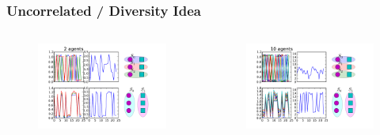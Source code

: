\documentclass[xcolor=dvipsnames]{beamer}
\begin{document}
%
%
\begin{frame}
	\frametitle{Uncorrelated / Diversity Idea}

	\begin{columns}
		\begin{column}{.5 \linewidth}
			\begin{figure}
				\includegraphics[scale=.4]{2_agents.pdf}
			\end{figure}
		\end{column}
		\begin{column}{.5 \linewidth}
			\begin{figure}
				\includegraphics[scale=.36]{10_agents.pdf}
			\end{figure}
			\begin{figure}

\end{figure}
\end{column}
\end{columns}
\end{frame}
\end{document}
